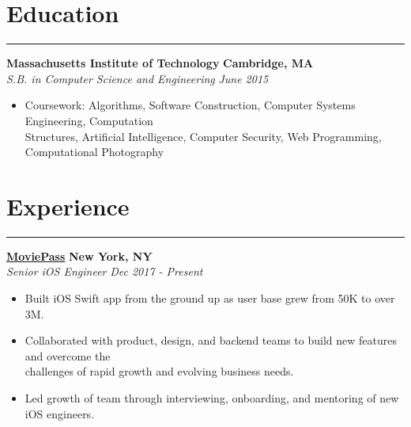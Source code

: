 \documentclass{res}
\begin{document}
\begin{resume} 
 
\section{{\large Education} } 

\vspace{-10pt}

\noindent\rule{\resumewidth}{0.4pt}   

\vspace{-5pt}

{\bf Massachusetts Institute of Technology} \hfill {\bf Cambridge, MA} \\
{\textit {S.B. in Computer Science and Engineering}} \hfill {\textit {June 2015}} \\
\vspace{-10pt}
\begin{itemize}
\itemsep -2pt  
\item Coursework: Algorithms, Software Construction, Computer Systems Engineering,  Computation  \\
Structures, Artificial Intelligence, Computer Security, Web Programming, Computational Photography

\end{itemize}

\section{{\large Experience}}

\vspace{-10pt}

\noindent\rule{\resumewidth}{0.4pt}   

\vspace{-5pt}

\href{https://www.moviepass.com/}{\bf MoviePass} \hfill {\bf New York, NY} \\
{\textit {Senior iOS Engineer}} \hfill {\textit {Dec 2017 - Present}} 
\begin{itemize}
\itemsep -2pt  
\item Built iOS Swift app from the ground up as user base grew from 50K to over 3M.
\item Collaborated with product, design, and backend teams to build new features and overcome the \\ challenges of rapid growth and evolving business needs.
\item Led growth of team through interviewing, onboarding, and mentoring of new iOS engineers. 
\end{itemize}


\end{resume}
\end{document}

